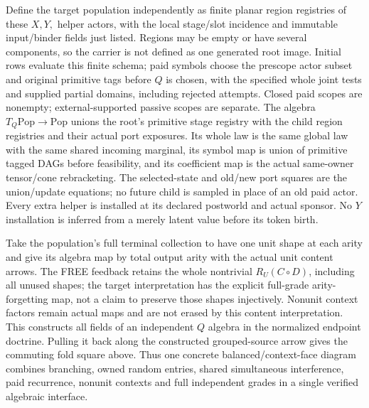 \documentclass[11pt]{article}
\begin{document}
Define the target population independently as finite planar region registries of these $X,Y,$ helper actors, with the local stage/slot incidence and immutable input/binder fields just listed. Regions may be empty or have several components, so the carrier is not defined as one generated root image. Initial rows evaluate this finite schema; paid symbols choose the prescope actor subset and original primitive tags before $Q$ is chosen, with the specified whole joint tests and supplied partial domains, including rejected attempts. Closed paid scopes are nonempty; external-supported passive scopes are separate. The algebra $T_Q\mathrm{Pop}\to\mathrm{Pop}$ unions the root's primitive stage registry with the child region registries and their actual port exposures. Its whole law is the same global law with the same shared incoming marginal, its symbol map is union of primitive tagged DAGs before feasibility, and its coefficient map is the actual same-owner tensor/cone rebracketing. The selected-state and old/new port squares are the union/update equations; no future child is sampled in place of an old paid actor. Every extra helper is installed at its declared postworld and actual sponsor. No $Y$ installation is inferred from a merely latent value before its token birth.

Take the population's full terminal collection to have one unit shape at each arity and give its algebra map by total output arity with the actual unit content arrows. The FREE feedback retains the whole nontrivial $R_U(C\circ D)$, including all unused shapes; the target interpretation has the explicit full-grade arity-forgetting map, not a claim to preserve those shapes injectively. Nonunit context factors remain actual maps and are not erased by this content interpretation. This constructs all fields of an independent $Q$ algebra in the normalized endpoint doctrine. Pulling it back along the constructed grouped-source arrow gives the commuting fold square above. Thus one concrete balanced/context-face diagram combines branching, owned random entries, shared simultaneous interference, paid recurrence, nonunit contexts and full independent grades in a single verified algebraic interface.
\end{document}
